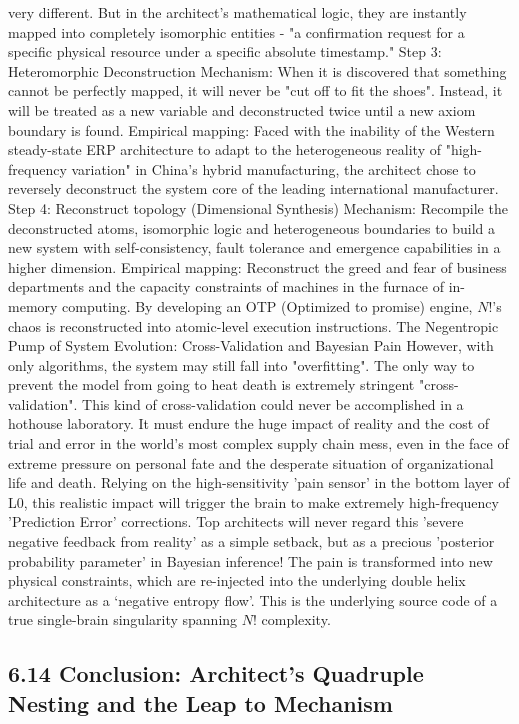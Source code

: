\documentclass[11pt,a4paper]{article}
\begin{document}
very different. But in the architect's mathematical logic, they are instantly mapped into completely isomorphic entities - "a confirmation request for a specific physical resource under a specific absolute timestamp." Step 3: Heteromorphic Deconstruction Mechanism: When it is discovered that something cannot be perfectly mapped, it will never be "cut off to fit the shoes". Instead, it will be treated as a new variable and deconstructed twice until a new axiom boundary is found. Empirical mapping: Faced with the inability of the Western steady-state ERP architecture to adapt to the heterogeneous reality of "high-frequency variation" in China's hybrid manufacturing, the architect chose to reversely deconstruct the system core of the leading international manufacturer. Step 4: Reconstruct topology (Dimensional Synthesis) Mechanism: Recompile the deconstructed atoms, isomorphic logic and heterogeneous boundaries to build a new system with self-consistency, fault tolerance and emergence capabilities in a higher dimension. Empirical mapping: Reconstruct the greed and fear of business departments and the capacity constraints of machines in the furnace of in-memory computing. By developing an OTP (Optimized to promise) engine, $N!$'s chaos is reconstructed into atomic-level execution instructions. The Negentropic Pump of System Evolution: Cross-Validation and Bayesian Pain However, with only algorithms, the system may still fall into "overfitting". The only way to prevent the model from going to heat death is extremely stringent "cross-validation". This kind of cross-validation could never be accomplished in a hothouse laboratory. It must endure the huge impact of reality and the cost of trial and error in the world's most complex supply chain mess, even in the face of extreme pressure on personal fate and the desperate situation of organizational life and death. Relying on the high-sensitivity 'pain sensor' in the bottom layer of L0, this realistic impact will trigger the brain to make extremely high-frequency 'Prediction Error' corrections. Top architects will never regard this 'severe negative feedback from reality' as a simple setback, but as a precious 'posterior probability parameter' in Bayesian inference! The pain is transformed into new physical constraints, which are re-injected into the underlying double helix architecture as a ‘negative entropy flow’. This is the underlying source code of a true single-brain singularity spanning $N!$ complexity.


\subsection*{6.14 Conclusion: Architect’s Quadruple Nesting and the Leap to Mechanism}
\end{document}
